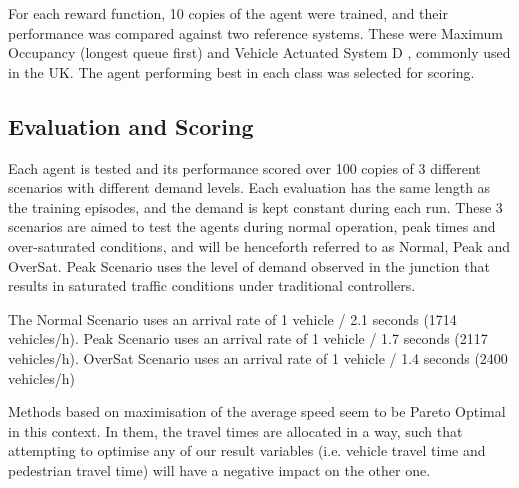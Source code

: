 \documentclass[conference]{IEEEtran}
\begin{document}
For each reward function, 10 copies of the agent were trained, and their performance was compared against two reference systems. These were Maximum Occupancy (longest queue first) and Vehicle Actuated System D \cite{highways}, commonly used in the UK. The agent performing best in each class was selected for scoring.
\subsection{Evaluation and Scoring}
Each agent is tested and its performance scored over 100 copies of 3 different scenarios with different demand levels. Each evaluation has the same length as the training episodes, and the demand is kept constant during each run.
These 3 scenarios are aimed to test the agents during normal operation, peak times and over-saturated conditions, and will be henceforth referred to as Normal, Peak and OverSat.
Peak Scenario uses the level of demand observed in the junction that results in saturated traffic conditions under traditional controllers.

The Normal Scenario uses an arrival rate of 1 vehicle / 2.1 seconds (1714 vehicles/h). Peak Scenario uses an arrival rate of 1 vehicle / 1.7 seconds (2117 vehicles/h). OverSat Scenario uses an arrival rate of 1 vehicle / 1.4 seconds (2400 vehicles/h)

Methods based on maximisation of the average speed seem to be Pareto Optimal in this context.
In them, the travel times are allocated in a way, such that attempting to optimise any of our result variables (i.e. vehicle travel time and pedestrian travel time) will have a negative impact on the other one.
\end{document}

